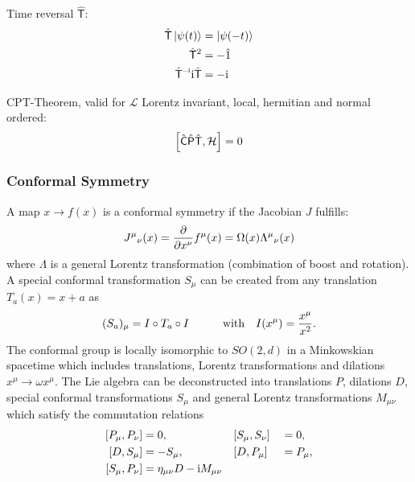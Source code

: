 			\noindent
			Time reversal $\hat{\mathsf{T}}$:
			\begin{equation}
				\begin{aligned}
					\hat{\mathsf{T}} \Ket{\psi(t)} &= \Ket{\psi(-t)} \\
					\hat{\mathsf{T}}^2 &= - \hat{1} \\
					\inv{\hat{\mathsf{T}}} \i \hat{\mathsf{T}} &= -\i \\
				\end{aligned}
			\end{equation}

			\noindent
			CPT-Theorem, valid for $\mathcal{L}$ Lorentz invariant, local, hermitian and normal ordered:
			\begin{equation}
				\comm{\hat{\mathsf{C}}\hat{\mathsf{P}}\hat{\mathsf{T}}}{\mathcal{H}} = 0
			\end{equation}


		\subsubsection{Conformal Symmetry}
			A map $x\to f(x)$ is a conformal symmetry if the Jacobian $J$ fulfills:
			\begin{equation}
				J^\mu{}_\nu(x) = \pdv{x^\nu} f^\mu(x) = \Omega(x) \Lambda^\mu{}_\nu(x)
			\end{equation}
			where $\Lambda$ is a general Lorentz transformation (\ie combination of boost and rotation).
			A special conformal transformation $S_\mu$ can be created from any translation $T_a(x) = x+a$ as
			\begin{equation}
				(S_a)_{\mu} = I\circ T_a \circ I \hspace{30pt}\text{with}\quad I(x^\mu) = \frac{x^\mu}{x^2}.
			\end{equation}
			The conformal group is locally isomorphic to $SO(2,d)$ in a Minkowskian spacetime which includes translations, Lorentz transformations and dilations $x^\mu \to \omega x^\mu$. The Lie algebra can be deconstructed into translations $P$, dilations $D$, special conformal transformations $S_\mu$ and general Lorentz transformations $M_{\mu\nu}$ which satisfy the commutation relations
			\begin{alignat}{3}
				\comm{P_\mu}{P_\nu} &= 0,\hsp&&\comm{S_\mu}{S_\nu} &&= 0, \\
				\comm{D}{S_\mu} &= - S_\mu,\hsp&& \comm{D}{P_\mu} &&= P_\mu, \\
				\comm{S_\mu}{P_\nu} &= \eta_{\mu\nu} D - \i M_{\mu\nu}
			\end{alignat}


